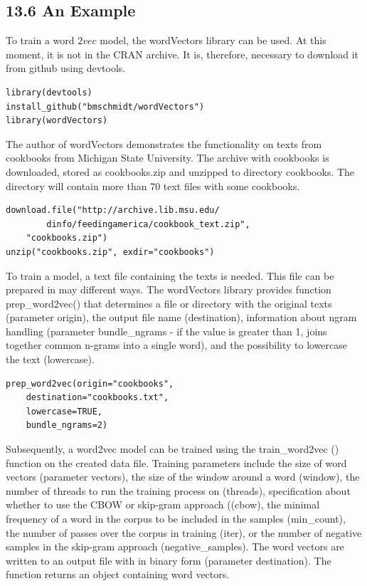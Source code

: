 \documentclass[10pt]{book}
\begin{document}
\subsection*{13.6 An Example}
To train a word $2 v e c$ model, the wordVectors library can be used. At this moment, it is not in the CRAN archive. It is, therefore, necessary to download it from github using devtools.

\begin{verbatim}
library(devtools)
install_github("bmschmidt/wordVectors")
library(wordVectors)
\end{verbatim}

The author of wordVectors demonstrates the functionality on texts from cookbooks from Michigan State University. The archive with cookbooks is downloaded, stored as cookbooks.zip and unzipped to directory cookbooks. The directory will contain more than 70 text files with some cookbooks.

\begin{verbatim}
download.file("http://archive.lib.msu.edu/
        dinfo/feedingamerica/cookbook_text.zip",
    "cookbooks.zip")
unzip("cookbooks.zip", exdir="cookbooks")
\end{verbatim}

To train a model, a text file containing the texts is needed. This file can be prepared in may different ways. The wordVectors library provides function prep\_word2vec() that determines a file or directory with the original texts (parameter origin), the output file name (destination), information about ngram handling (parameter bundle\_ngrams - if the value is greater than 1, joins together common n-grams into a single word), and the possibility to lowercase the text (lowercase).

\begin{verbatim}
prep_word2vec(origin="cookbooks",
    destination="cookbooks.txt",
    lowercase=TRUE,
    bundle_ngrams=2)
\end{verbatim}

Subsequently, a word2vec model can be trained using the train\_word2vec () function on the created data file. Training parameters include the size of word vectors (parameter vectors), the size of the window around a word (window), the number of threads to run the training process on (threads), specification about whether to use the CBOW or skip-gram approach ((cbow), the minimal frequency of a word in the corpus to be included in the samples (min\_count),\\
the number of passes over the corpus in training (iter), or the number of negative samples in the skip-gram approach (negative\_samples). The word vectors are written to an output file with in binary form (parameter destination). The function returns an object containing word vectors.
\end{document}
